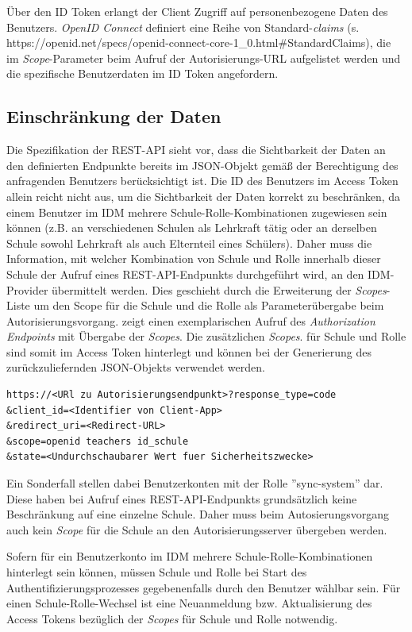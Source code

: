 Über den ID Token erlangt der Client Zugriff auf personenbezogene Daten des Benutzers. 
\textit{OpenID Connect} definiert eine Reihe von Standard-\textit{claims} (s. https://openid.net/specs/openid-connect-core-1_0.html#StandardClaims), die im \textit{Scope}-Parameter beim Aufruf der Autorisierungs-URL aufgelistet werden und die spezifische Benutzerdaten im ID Token angefordern.

\subsection{Einschränkung der Daten}
\label{auth:limit_data}

Die Spezifikation der REST-API sieht vor, dass die Sichtbarkeit der Daten an den definierten Endpunkte bereits im JSON-Objekt gemäß der Berechtigung des anfragenden Benutzers berücksichtigt ist. 
Die ID des Benutzers im Access Token allein reicht nicht aus, um die Sichtbarkeit der Daten korrekt zu beschränken, da einem Benutzer im IDM mehrere Schule-Rolle-Kombinationen zugewiesen sein können (z.B. an verschiedenen Schulen als Lehrkraft tätig oder an derselben Schule sowohl Lehrkraft als auch Elternteil eines Schülers). 
Daher muss die Information, mit welcher Kombination von Schule und Rolle innerhalb dieser Schule der Aufruf eines REST-API-Endpunkts durchgeführt wird, an den IDM-Provider übermittelt werden. 
Dies geschieht durch die Erweiterung der \textit{Scopes}-Liste um den Scope für die Schule und die Rolle als Parameterübergabe beim Autorisierungsvorgang. 
 zeigt einen exemplarischen Aufruf des \textit{Authorization Endpoints} mit Übergabe der \textit{Scopes}.
Die zusätzlichen \textit{Scopes}. für Schule und Rolle sind somit im Access Token hinterlegt und können bei der Generierung des zurückzuliefernden JSON-Objekts verwendet werden.

\begin{lstlisting}[caption={Beispielhafter Aufruf des Authorization Endpoints},frame=tlrb]
https://<URl zu Autorisierungsendpunkt>?response_type=code
&client_id=<Identifier von Client-App>
&redirect_uri=<Redirect-URL>
&scope=openid teachers id_schule
&state=<Undurchschaubarer Wert fuer Sicherheitszwecke>
\end{lstlisting}
\label{listing:authorization_request}

Ein Sonderfall stellen dabei Benutzerkonten mit der Rolle ''sync-system'' dar. 
Diese haben bei Aufruf eines REST-API-Endpunkts grundsätzlich keine Beschränkung auf eine einzelne Schule. 
Daher muss beim Autosierungsvorgang auch kein \textit{Scope} für die Schule an den Autorisierungsserver übergeben werden.

Sofern für ein Benutzerkonto im IDM mehrere Schule-Rolle-Kombinationen hinterlegt sein können, müssen Schule und Rolle bei Start des Authentifizierungsprozesses gegebenenfalls durch den Benutzer wählbar sein. 
Für einen Schule-Rolle-Wechsel ist eine Neuanmeldung bzw. Aktualisierung des Access Tokens bezüglich der \textit{Scopes} für Schule und Rolle notwendig.